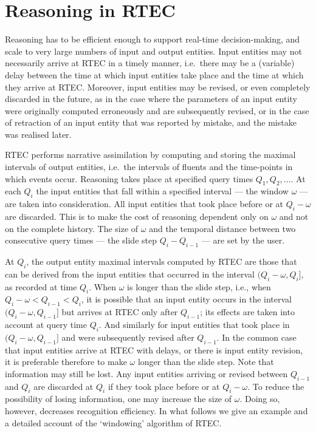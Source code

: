 \section{Reasoning in RTEC}\label{sec:reasoning example}

Reasoning has to be efficient enough to support real-time decision-making, and scale to very large numbers of input and output entities. Input entities may not necessarily arrive at RTEC in a timely manner, i.e.~there may be a (variable) delay between the time at which input entities take place and the time at which they arrive at RTEC. Moreover, input entities may be revised, or even completely discarded in the future, as in the case where the parameters of an input entity were originally computed erroneously and are subsequently revised, or in the case of retraction of an input entity that was reported by mistake, and the mistake was realised later.

RTEC performs narrative assimilation by computing and storing the maximal intervals of output entities, i.e.~the intervals of fluents and the time-points in which events occur. Reasoning takes place at specified query times $Q_1, Q_{2}, \dots$. At each $Q_i$ the input entities that fall within a specified interval --- the window $\omega$ --- are taken into consideration. All input entities that took place before or at $Q_i{-}\omega$ are discarded. This is to make the cost of reasoning dependent only on $\omega$ and not on the complete history. The size of $\omega$ and the temporal distance between two consecutive query times --- the slide step $Q_{i}{-}Q_{i-1}$ --- are set by the user. 

At $Q_i$, the output entity maximal intervals computed by RTEC are those that can be derived from the input entities that occurred in the interval $(Q_{i}{-}\omega, Q_{i}]$, as recorded at time $Q_i$. When $\omega$ is longer than the slide step, i.e., when $Q_{i}{-}\omega {<} Q_{i-1} {<} Q_{i}$, it is possible that an input entity occurs in the interval $(Q_{i}{-}\omega, Q_{i-1}]$ but arrives at RTEC only after $Q_{i-1}$; its effects are taken into account at query time $Q_i$. And similarly for input entities that took place in $(Q_{i}{-}\omega, Q_{i-1}]$ and were subsequently revised after $Q_{i-1}$. In the common case that input entities arrive at RTEC with delays, or there is input entity revision, it is preferable therefore to make $\omega$ longer than the slide step. 
Note that information may still be lost. Any input entities arriving or revised between $Q_{i-1}$ and $Q_i$ are discarded at $Q_i$ if they took place before or at $Q_i{-}\omega$. 
To reduce the possibility of losing information, one may increase the size of $\omega$. Doing so, however, decreases recognition efficiency. In what follows we give an example and a detailed account of the `windowing' algorithm of RTEC.

